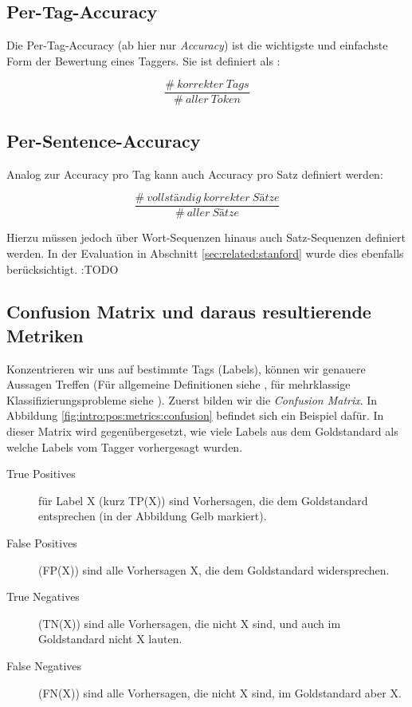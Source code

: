\subsection{Per-Tag-Accuracy}

Die Per-Tag-Accuracy (ab hier nur \textit{Accuracy}) ist die wichtigste und einfachste Form der Bewertung eines Taggers. Sie ist definiert als \cite{Rao} :

\[ \frac{\# \: korrekter \:  Tags}{\# \: aller \:  Token} \]

\subsection{Per-Sentence-Accuracy}

Analog zur Accuracy pro Tag kann auch Accuracy pro Satz definiert werden:

\[ \frac{\# \: vollständig \: korrekter \:  Sätze}{\# \: aller \:  Sätze} \]

Hierzu müssen jedoch über Wort-Sequenzen hinaus auch Satz-Sequenzen definiert werden. In der Evaluation in Abschnitt \ref{sec:related:stanford} wurde dies ebenfalls berücksichtigt. :TODO

\subsection{Confusion Matrix und daraus resultierende Metriken}
Konzentrieren wir uns auf bestimmte Tags (Labels), können wir genauere Aussagen Treffen
(Für allgemeine Definitionen siehe \cite{Rao}, für mehrklassige Klassifizierungsprobleme siehe \cite{Web:rxnlp}). Zuerst bilden wir die \textit{Confusion Matrix}. In Abbildung \ref{fig:intro:pos:metrics:confusion} befindet sich ein Beispiel dafür. In dieser Matrix wird gegenübergesetzt, wie viele Labels aus dem Goldstandard als welche Labels vom Tagger vorhergesagt wurden.
\begin{description}

\item[True Positives] für Label X (kurz TP(X)) sind Vorhersagen, die dem Goldstandard entsprechen (in der Abbildung Gelb markiert).
\item[False Positives] (FP(X)) sind alle Vorhersagen X, die dem Goldstandard widersprechen.
\item[True Negatives] (TN(X)) sind alle Vorhersagen, die nicht X sind, und auch im Goldstandard nicht X lauten.
\item[False Negatives] (FN(X)) sind alle Vorhersagen, die nicht X sind, im Goldstandard aber X.
\end{description}

